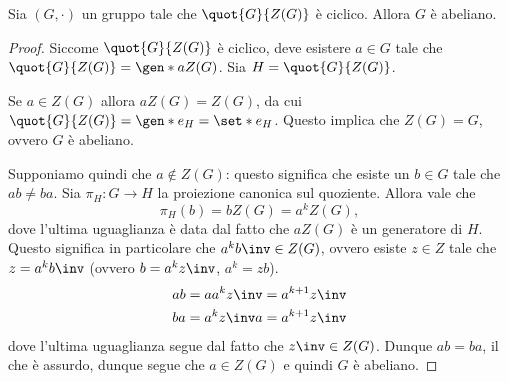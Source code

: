 \begin{proposition}\label{prop:G/Z(G)_cyclic=>abelian_G}
    Sia $(G, \cdot)$ un gruppo tale che $\quot{G}{Z(G)}$ è ciclico. Allora $G$ è abeliano.
\end{proposition}
\begin{proof}
    Siccome $\quot{G}{Z(G)}$ è ciclico, deve esistere $a \in G$ tale che $\quot{G}{Z(G)} = \gen*{aZ(G)}$. Sia $H = \quot{G}{Z(G)}$.

    Se $a \in Z(G)$ allora $aZ(G) = Z(G)$, da cui $\quot{G}{Z(G)} = \gen*{e_H} = \set*{e_H}$. Questo implica che $Z(G) = G$, ovvero $G$ è abeliano.

    Supponiamo quindi che $a \notin Z(G)$: questo significa che esiste un $b \in G$ tale che $ab \neq ba$.
    Sia $\pi_H : G \to H$ la proiezione canonica sul quoziente. Allora vale che \[
        \pi_H(b) = bZ(G) = a^kZ(G),
    \] dove l'ultima uguaglianza è data dal fatto che $aZ(G)$ è un generatore di $H$. 
    Questo significa in particolare che $a^kb\inv \in Z(G)$, ovvero esiste $z \in Z$ tale che $z = a^kb\inv$ (ovvero $b = a^kz\inv$, $a^k=zb$).
    \begin{align*}
        ab = aa^kz\inv = a^{k+1}z\inv\\
        ba = a^kz\inv a = a^{k+1}z\inv 
    \end{align*} dove l'ultima uguaglianza segue dal fatto che $z\inv \in Z(G)$. Dunque $ab = ba$, il che è assurdo, dunque segue che $a \in Z(G)$ e quindi $G$ è abeliano.

\end{proof}

